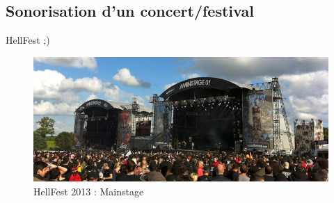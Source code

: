\documentclass[aspectratio=169]{beamer}
\begin{document}
\subsection{Sonorisation d'un concert/festival}
\begin{frame}{HellFest ;)}
	\begin{figure}[!h]
	\begin{center}
	\includegraphics[width=1\textwidth]{figure/hellfest+main+stage.jpg}
	\end{center}
	\caption{HellFest 2013 : Mainstage}
	\end{figure}
\end{frame}
\end{document}
